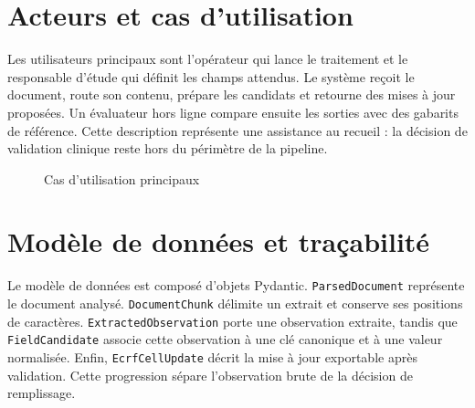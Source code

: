 \section{Acteurs et cas d'utilisation}
Les utilisateurs principaux sont l'opérateur qui lance le traitement et le responsable d'étude qui définit les champs attendus. Le système reçoit le document, route son contenu, prépare les candidats et retourne des mises à jour proposées. Un évaluateur hors ligne compare ensuite les sorties avec des gabarits de référence. Cette description représente une assistance au recueil : la décision de validation clinique reste hors du périmètre de la pipeline.

\begin{figure}[H]
\centering
{}
\caption{Cas d'utilisation principaux}
\end{figure}

\section{Modèle de données et traçabilité}
Le modèle de données est composé d'objets Pydantic. \texttt{ParsedDocument} représente le document analysé. \texttt{DocumentChunk} délimite un extrait et conserve ses positions de caractères. \texttt{ExtractedObservation} porte une observation extraite, tandis que \texttt{FieldCandidate} associe cette observation à une clé canonique et à une valeur normalisée. Enfin, \texttt{EcrfCellUpdate} décrit la mise à jour exportable après validation. Cette progression sépare l'observation brute de la décision de remplissage.

